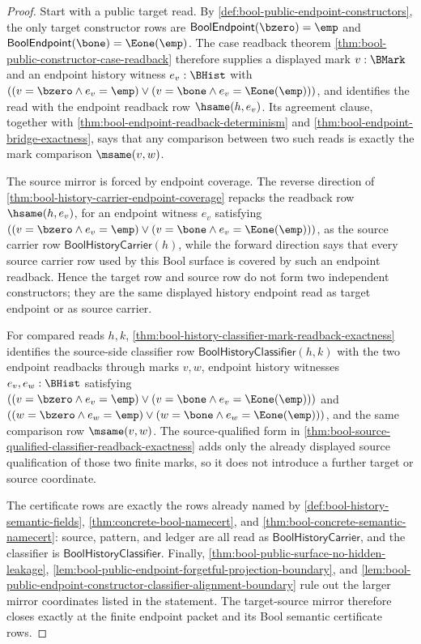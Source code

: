 \begin{proof}
Start with a public target read. By \autoref{def:bool-public-endpoint-constructors}, the only target constructor rows are
$\mathsf{BoolEndpoint}(\bzero)=\emp$ and
$\mathsf{BoolEndpoint}(\bone)=\Eone(\emp)$. The case readback theorem \autoref{thm:bool-public-constructor-case-readback} therefore supplies a displayed mark $v:\BMark$ and an endpoint history witness $e_v:\BHist$ with
$((v=\bzero \land e_v=\emp) \lor (v=\bone \land e_v=\Eone(\emp)))$, and identifies the read with the endpoint readback row $\hsame(h,e_v)$. Its agreement clause, together with \autoref{thm:bool-endpoint-readback-determinism} and \autoref{thm:bool-endpoint-bridge-exactness}, says that any comparison between two such reads is exactly the mark comparison $\msame(v,w)$.

The source mirror is forced by endpoint coverage. The reverse direction of \autoref{thm:bool-history-carrier-endpoint-coverage} repacks the readback row $\hsame(h,e_v)$, for an endpoint witness $e_v$ satisfying
$((v=\bzero \land e_v=\emp) \lor (v=\bone \land e_v=\Eone(\emp)))$, as the source carrier row $\mathsf{BoolHistoryCarrier}(h)$, while the forward direction says that every source carrier row used by this Bool surface is covered by such an endpoint readback. Hence the target row and source row do not form two independent constructors; they are the same displayed history endpoint read as target endpoint or as source carrier.

For compared reads $h,k$, \autoref{thm:bool-history-classifier-mark-readback-exactness} identifies the source-side classifier row $\mathsf{BoolHistoryClassifier}(h,k)$ with the two endpoint readbacks through marks $v,w$, endpoint history witnesses $e_v,e_w:\BHist$ satisfying
$((v=\bzero \land e_v=\emp) \lor (v=\bone \land e_v=\Eone(\emp)))$ and
$((w=\bzero \land e_w=\emp) \lor (w=\bone \land e_w=\Eone(\emp)))$, and the same comparison row $\msame(v,w)$. The source-qualified form in \autoref{thm:bool-source-qualified-classifier-readback-exactness} adds only the already displayed source qualification of those two finite marks, so it does not introduce a further target or source coordinate.

The certificate rows are exactly the rows already named by \autoref{def:bool-history-semantic-fields}, \autoref{thm:concrete-bool-namecert}, and \autoref{thm:bool-concrete-semantic-namecert}: source, pattern, and ledger are all read as $\mathsf{BoolHistoryCarrier}$, and the classifier is $\mathsf{BoolHistoryClassifier}$. Finally, \autoref{thm:bool-public-surface-no-hidden-leakage}, \autoref{lem:bool-public-endpoint-forgetful-projection-boundary}, and \autoref{lem:bool-public-endpoint-constructor-classifier-alignment-boundary} rule out the larger mirror coordinates listed in the statement. The target-source mirror therefore closes exactly at the finite endpoint packet and its Bool semantic certificate rows.
\end{proof}

